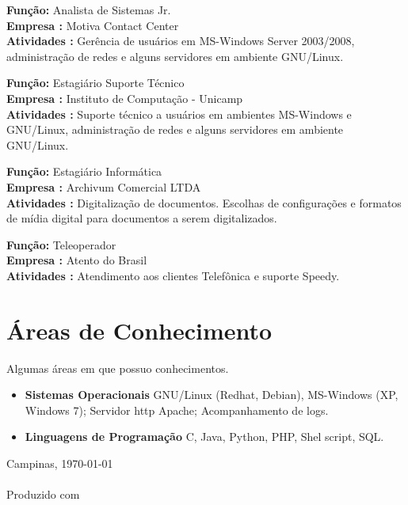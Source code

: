 \documentclass[a4paper]{article}
\begin{document}
\begin{CV}

\item[Desde 08/2011] \textbf{Função:} Analista de Sistemas Jr.
\\ \textbf{Empresa :} Motiva Contact Center
\\ \textbf{Atividades :} Gerência de usuários em MS-Windows Server 2003/2008, administração de redes e alguns  
servidores em ambiente GNU/Linux.

\item[07/2010--08/2011] \textbf{Função:} Estagiário Suporte Técnico
\\ \textbf{Empresa :} Instituto de Computação - Unicamp
\\ \textbf{Atividades :} Suporte técnico a usuários em ambientes MS-Windows e GNU/Linux, administração de redes e alguns  
servidores em ambiente GNU/Linux.

\item[01/2010--06/2010] \textbf{Função:} Estagiário Informática
\\ \textbf{Empresa :} Archivum Comercial LTDA
\\ \textbf{Atividades :} Digitalização de documentos. Escolhas de configurações e formatos de mídia digital para documentos a serem digitalizados.

\item[05/2007--07/2009] \textbf{Função:} Teleoperador
\\ \textbf{Empresa :} Atento do Brasil
\\ \textbf{Atividades :} Atendimento aos clientes Telefônica e suporte Speedy.

\end{CV}

\section{Áreas de Conhecimento}
Algumas áreas em que possuo conhecimentos.
\begin{itemize}
	\item \textbf{Sistemas Operacionais} GNU/Linux (Redhat, Debian), MS-Windows (XP, Windows 7); Servidor http Apache; Acompanhamento de logs.
	\item \textbf{Linguagens de Programação} C, Java, Python, PHP, Shel script, SQL.
\end{itemize}
\vspace{2\baselineskip}
\noindent Campinas, \today
\\
\\Produzido com \small \LaTeXe
\end{document}

